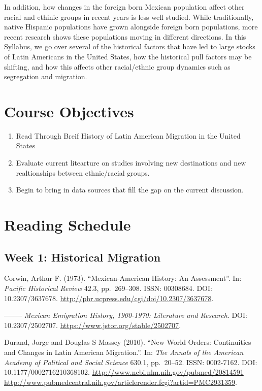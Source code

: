 \documentclass[11pt,]{article}
\begin{document}
In addition, how changes in the foreign born Mexican population affect
other racial and ethinic groups in recent years is less well studied.
While traditionally, native Hispanic populations have grown alongside
foreign born populations, more recent research shows these populations
moving in different directions. In this Syllabus, we go over several of
the historical factors that have led to large stocks of Latin Americans
in the United States, how the historical pull factors may be shifting,
and how this affects other racial/ethnic group dynamics such as
segregation and migration.

\hypertarget{course-objectives}{%
\section{Course Objectives}\label{course-objectives}}

\begin{enumerate}
\def\labelenumi{\arabic{enumi}.}
\item
  Read Through Breif History of Latin American Migration in the United
  States
\item
  Evaluate current litearture on studies involving new destinations and
  new realtionships between ethnic/racial groups.
\item
  Begin to bring in data sources that fill the gap on the current
  discussion.
\end{enumerate}

\hypertarget{reading-schedule}{%
\section{Reading Schedule}\label{reading-schedule}}

\hypertarget{week-1-historical-migration}{%
\subsection{Week 1: Historical
Migration}\label{week-1-historical-migration}}

Corwin, Arthur F. (1973). ``Mexican-American History: An Assessment''.
In: \emph{Pacific Historical Review} 42.3, pp.~269--308. ISSN: 00308684.
DOI: 10.2307/3637678.
\url{http://phr.ucpress.edu/cgi/doi/10.2307/3637678}.

--------
\emph{Mexican Emigration History, 1900-1970: Literature and Research}.
DOI: 10.2307/2502707. \url{https://www.jstor.org/stable/2502707}.

Durand, Jorge and Douglas S Massey (2010). ``New World Orders:
Continuities and Changes in Latin American Migration.''. In:
\emph{The Annals of the American Academy of Political and Social Science}
630.1, pp.~20--52. ISSN: 0002-7162. DOI: 10.1177/0002716210368102.
\url{http://www.ncbi.nlm.nih.gov/pubmed/20814591 http://www.pubmedcentral.nih.gov/articlerender.fcgi?artid=PMC2931359}.
\end{document}
